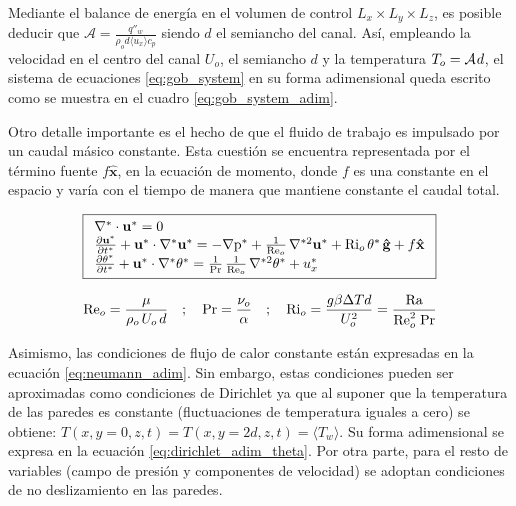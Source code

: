 Mediante el balance de energía en el volumen de control $L_x \times L_y \times L_z$, es posible deducir que $\mathcal{A} = \frac{q''_w}{\rho_o  d \langle u_x \rangle c_p}$ siendo $d$ el semiancho del canal. Así, empleando la velocidad en el centro del canal $U_o$, el semiancho $d$ y la temperatura $T_o = \mathcal{A} \hspace{0.3mm} d $, el sistema de ecuaciones \ref{eq:gob_system} en su forma adimensional queda escrito como se muestra en el cuadro \ref{eq:gob_system_adim}. 

Otro detalle importante es el hecho de que el fluido de trabajo es impulsado por un caudal másico constante. Esta cuestión se encuentra representada por el término fuente $f \mathbf{\hat{x}}$, en la ecuación de momento, donde $f$ es una constante en el espacio y varía con el tiempo de manera que mantiene constante el caudal total. 

\begin{equation}
\boxed{
\begin{array}{l}
    \nabla^* \cdot \mathbf{u^*} = 0 \\
    \frac{\partial \mathbf{u^*}}{\partial t^*} + \mathbf{u^*} \cdot \nabla^* \mathbf{u^*} = 
    -\nabla \text{p}^* + \frac{1}{\text{Re}_o} \hspace{0.5mm} \nabla^{*2} \mathbf{u^*} + \text{Ri}_o \hspace{0.5mm} \theta^* \hspace{0.5mm} \mathbf{\hat{g}} + f \mathbf{\hat{x}} \\
    \frac{\partial \theta^*}{\partial t^*} + \mathbf{u^*} \cdot \nabla^* \theta^* = 
    \frac{1}{\text{Pr}}\hspace{0.5mm}  \frac{1}{\text{Re}_o} \hspace{0.5mm} \nabla^{*2} \theta^* + u_x^* 
\end{array}
}
\label{eq:gob_system_adim}
\end{equation}

$$\text{Re}_o = \frac{\mu}{\rho_o \hspace{0.5mm} U_o\hspace{0.5mm} d } \quad ; \quad \text{Pr}= \frac{\nu_o}{\alpha} \quad ; \quad \text{Ri}_o = \frac{g \beta \Delta T d}{U_o^2} = \frac{\text{Ra}}{\text{Re}_o^2 \hspace{1mm} \text{Pr}}$$

Asimismo, las condiciones de flujo de calor constante están expresadas en la ecuación \ref{eq:neumann_adim}. Sin embargo, estas condiciones pueden ser aproximadas como condiciones de Dirichlet ya que al suponer que la temperatura de las paredes es constante (fluctuaciones de temperatura iguales a cero) se obtiene: $T(x,y=0,z,t) = T(x,y=2d,z,t) = \langle T_w \rangle$. Su forma adimensional se expresa en la ecuación \ref{eq:dirichlet_adim_theta}. Por otra parte, para el resto de variables (campo de presión y componentes de velocidad) se adoptan condiciones de no deslizamiento en las paredes. 

